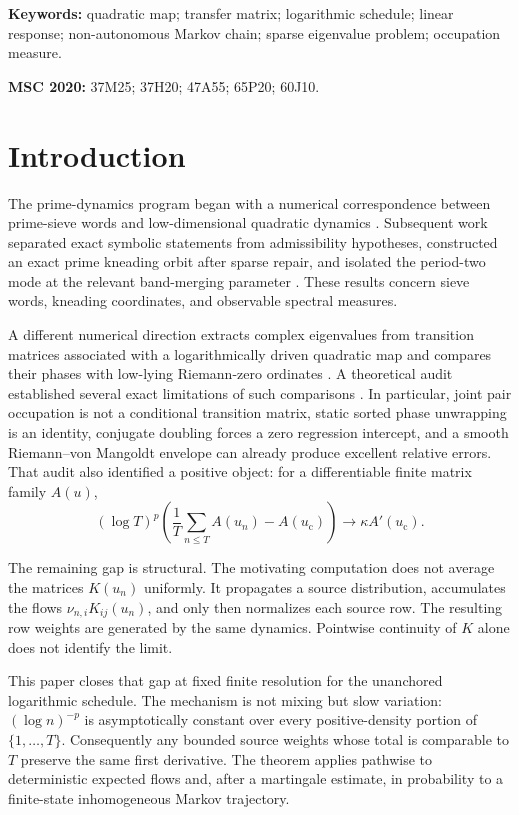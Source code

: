 \documentclass[11pt]{article}
\theoremstyle{definition}
\theoremstyle{remark}
\newcommand{\uc}{u_{\mathrm c}}
\begin{document}
\noindent\textbf{Keywords:} quadratic map; transfer matrix; logarithmic
schedule; linear response; non-autonomous Markov chain; sparse eigenvalue
problem; occupation measure.

\medskip
\noindent\textbf{MSC 2020:} 37M25; 37H20; 47A55; 65P20; 60J10.

\section{Introduction}

The prime-dynamics program began with a numerical correspondence between
prime-sieve words and low-dimensional quadratic dynamics
\citep{Wang2026Published}.  Subsequent work separated exact symbolic
statements from admissibility hypotheses, constructed an exact prime kneading
orbit after sparse repair, and isolated the period-two mode at the relevant
band-merging parameter
\citep{WangReformulation2026,WangPrimeSpectrum2026,WangParity2026}.
These results concern sieve words, kneading coordinates, and observable
spectral measures.

A different numerical direction extracts complex eigenvalues from transition
matrices associated with a logarithmically driven quadratic map and compares
their phases with low-lying Riemann-zero ordinates
\citep{WangSpectralFlow2026}.  A theoretical audit established several exact
limitations of such comparisons \citep{WangObstructions2026}.  In particular,
joint pair occupation is not a conditional transition matrix, static sorted
phase unwrapping is an identity, conjugate doubling forces a zero regression
intercept, and a smooth Riemann--von Mangoldt envelope can already produce
excellent relative errors.  That audit also identified a positive object:
for a differentiable finite matrix family $A(u)$,
\[
  (\log T)^p\left(\frac1T\sum_{n\le T}A(u_n)-A(\uc)\right)
  \longrightarrow \kappa A'(\uc).
\]

The remaining gap is structural.  The motivating computation does not average
the matrices $K(u_n)$ uniformly.  It propagates a source distribution,
accumulates the flows $\nu_{n,i}K_{ij}(u_n)$, and only then normalizes each
source row.  The resulting row weights are generated by the same dynamics.
Pointwise continuity of $K$ alone does not identify the limit.

This paper closes that gap at fixed finite resolution for the unanchored
logarithmic schedule.  The mechanism is not mixing but slow variation:
$(\log n)^{-p}$ is asymptotically constant over every positive-density portion
of $\{1,\ldots,T\}$.  Consequently any bounded source weights whose total is
comparable to $T$ preserve the same first derivative.  The theorem applies
pathwise to deterministic expected flows and, after a martingale estimate, in
probability to a finite-state inhomogeneous Markov trajectory.
\end{document}
